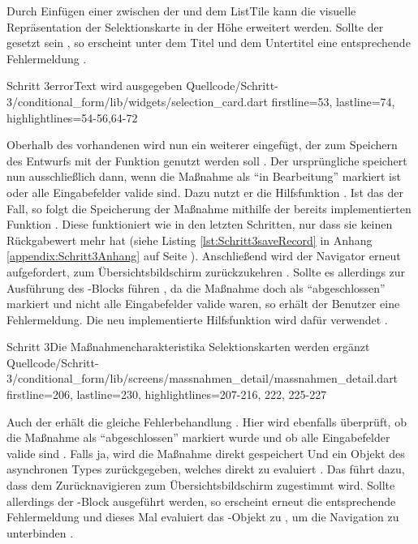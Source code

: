 Durch Einfügen einer  zwischen der   und dem ListTile  kann die visuelle Repräsentation der Selektionskarte in der Höhe erweitert werden.
Sollte der  gesetzt sein , so erscheint unter dem Titel und dem Untertitel eine entsprechende Fehlermeldung .
 

\begin{alexlisting}{Schritt 3}{errorText wird ausgegeben}
    {Quellcode/Schritt-3/conditional_form/lib/widgets/selection_card.dart}
    {firstline=53, lastline=74, highlightlines={54-56,64-72}}
    \label{lst:Schritt3ColumnErrorText}
\end{alexlisting}

Oberhalb des vorhandenen  wird nun ein weiterer eingefügt, der zum Speichern des Entwurfs mit der Funktion  genutzt werden soll .
Der ursprüngliche  speichert nun ausschließlich dann, wenn die Maßnahme als \enquote{in Bearbeitung} markiert ist oder alle Eingabefelder valide sind.
Dazu nutzt er die Hilfsfunktion  .
Ist das der Fall, so folgt die Speicherung der Maßnahme mithilfe der bereits implementierten Funktion  .
Diese funktioniert wie in den letzten Schritten, nur dass sie keinen Rückgabewert mehr hat (siehe Listing \ref{lst:Schritt3saveRecord} in Anhang \ref{appendix:Schritt3Anhang} auf Seite \pageref{appendix:Schritt3Anhang}).
Anschließend wird der Navigator erneut aufgefordert, zum Übersichtsbildschirm zurückzukehren .
Sollte es allerdings zur Ausführung des -Blocks führen ,
da die Maßnahme doch als \enquote{abgeschlossen} markiert und nicht alle Eingabefelder valide waren,
so erhält der Benutzer eine Fehlermeldung. Die neu implementierte Hilfsfunktion  wird dafür verwendet . 
   
\begin{alexlisting}{Schritt 3}{Die Maßnahmencharakteristika Selektionskarten werden ergänzt}
    {Quellcode/Schritt-3/conditional_form/lib/screens/massnahmen_detail/massnahmen_detail.dart}
    {firstline=206, lastline=230, highlightlines={207-216, 222, 225-227}}
    \label{lst:Schritt3FloatingActionButton}
\end{alexlisting} 

Auch der  erhält die gleiche Fehlerbehandlung \Lst{\ref{lst:Schritt3onWillPop}}. Hier wird ebenfalls überprüft, ob die Maßnahme als \enquote{abgeschlossen} markiert wurde und ob alle Eingabefelder valide sind . Falls ja, wird die Maßnahme direkt gespeichert Und ein Objekt des asynchronen Types  zurückgegeben, welches direkt zu  evaluiert . Das führt dazu, dass dem Zurücknavigieren zum Übersichtsbildschirm zugestimmt wird. Sollte allerdings der -Block ausgeführt werden, so erscheint erneut die entsprechende Fehlermeldung  und dieses Mal evaluiert das -Objekt zu , um die Navigation zu unterbinden . 

